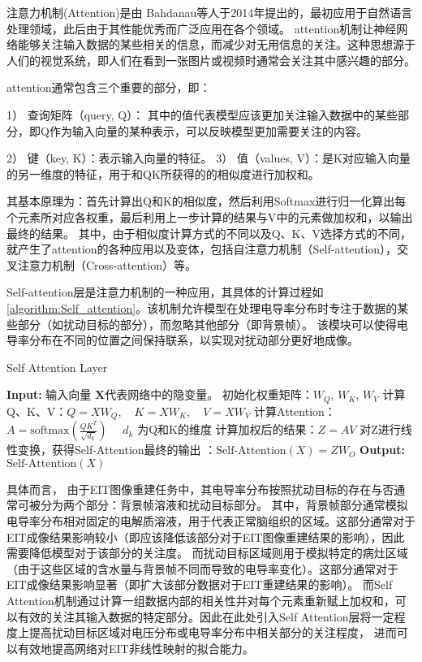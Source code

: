 注意力机制(Attention)是由 Bahdanau等人于2014年提出的\cite{2014Neural}，最初应用于自然语言处理领域，此后由于其性能优秀而广泛应用在各个领域。
attention机制让神经网络能够关注输入数据的某些相关的信息，而减少对无用信息的关注。这种思想源于人们的视觉系统，即人们在看到一张图片或视频时通常会关注其中感兴趣的部分。

attention通常包含三个重要的部分，即：

  1） 查询矩阵（query, Q）： 其中的值代表模型应该更加关注输入数据中的某些部分，即Q作为输入向量的某种表示，可以反映模型更加需要关注的内容。
  
  2） 键（key, K）：表示输入向量的特征。
  3） 值（values, V）：是K对应输入向量的另一维度的特征，用于和QK所获得的的相似度进行加权和。


其基本原理为：首先计算出Q和K的相似度，然后利用Softmax进行归一化算出每个元素所对应各权重，最后利用上一步计算的结果与V中的元素做加权和，以输出最终的结果。
其中，由于相似度计算方式的不同以及Q、K、V选择方式的不同，就产生了attention的各种应用以及变体，包括自注意力机制（Self-attention），交叉注意力机制（Cross-attention）等。

Self-attention层是注意力机制的一种应用，其具体的计算过程如\cref{algorithm:Self_attention}。该机制允许模型在处理电导率分布时专注于数据的某些部分（如扰动目标的部分），而忽略其他部分（即背景帧）。
该模块可以使得电导率分布在不同的位置之间保持联系，以实现对扰动部分更好地成像。

\begin{algorithm}

\caption{Self Attention Layer}
\begin{algorithmic}[1]
    \State \textbf{Input:} 输入向量 $\boldsymbol{X}$代表网络中的隐变量。
    \State 初始化权重矩阵：$W_Q$, $W_K$, $W_V$
    \State 计算Q、K、V：$Q = XW_Q, \quad K = XW_K, \quad V = XW_V$
    \State 计算Attention：$A = \text{softmax}\left(\frac{QK^T}{\sqrt{d_k}}\right) \quad $ $d_k$ 为Q和K的维度 
    \State 计算加权后的结果：$Z = AV$
    \State 对Z进行线性变换，获得Self-Attention最终的输出 ：$\text{Self-Attention}(X) = ZW_O$
    \State \textbf{Output:} $\text{Self-Attention}(X)$
\end{algorithmic}
\label{algorithm:Self_attention}
\end{algorithm}

具体而言， 由于EIT图像重建任务中，其电导率分布按照扰动目标的存在与否通常可被分为两个部分：背景帧溶液和扰动目标部分。
其中，背景帧部分通常模拟电导率分布相对固定的电解质溶液，用于代表正常脑组织的区域。这部分通常对于EIT成像结果影响较小（即应该降低该部分对于EIT图像重建结果的影响），因此需要降低模型对于该部分的关注度。
而扰动目标区域则用于模拟特定的病灶区域（由于这些区域的含水量与背景帧不同而导致的电导率变化）。这部分通常对于EIT成像结果影响显著（即扩大该部分数据对于EIT重建结果的影响）。
而Self Attention机制通过计算一组数据内部的相关性并对每个元素重新赋上加权和，可以有效的关注其输入数据的特定部分。因此在此处引入Self Attention层将一定程度上提高扰动目标区域对电压分布或电导率分布中相关部分的关注程度，
进而可以有效地提高网络对EIT非线性映射的拟合能力。

